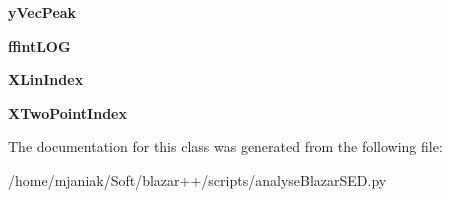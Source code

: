 \begin{DoxyCompactItemize}
\item 
\hypertarget{classanalyseBlazarSED_1_1blazarPlotter_1_1processData_ade3c5de983912b90354d3f12e1a67d88}{{\bfseries y\-Vec\-Peak}}\label{classanalyseBlazarSED_1_1blazarPlotter_1_1processData_ade3c5de983912b90354d3f12e1a67d88}

\item 
\hypertarget{classanalyseBlazarSED_1_1blazarPlotter_1_1processData_ab9519608ed1dffc6a31e6b44a9b8819d}{{\bfseries ffint\-L\-O\-G}}\label{classanalyseBlazarSED_1_1blazarPlotter_1_1processData_ab9519608ed1dffc6a31e6b44a9b8819d}

\item 
\hypertarget{classanalyseBlazarSED_1_1blazarPlotter_1_1processData_a317c6735c58dd735635b5998c5d6a86b}{{\bfseries X\-Lin\-Index}}\label{classanalyseBlazarSED_1_1blazarPlotter_1_1processData_a317c6735c58dd735635b5998c5d6a86b}

\item 
\hypertarget{classanalyseBlazarSED_1_1blazarPlotter_1_1processData_a086dfa59c480d5cc82b51244196e2d1c}{{\bfseries X\-Two\-Point\-Index}}\label{classanalyseBlazarSED_1_1blazarPlotter_1_1processData_a086dfa59c480d5cc82b51244196e2d1c}

\end{DoxyCompactItemize}


The documentation for this class was generated from the following file\-:\begin{DoxyCompactItemize}
\item 
/home/mjaniak/\-Soft/blazar++/scripts/analyse\-Blazar\-S\-E\-D.\-py\end{DoxyCompactItemize}
